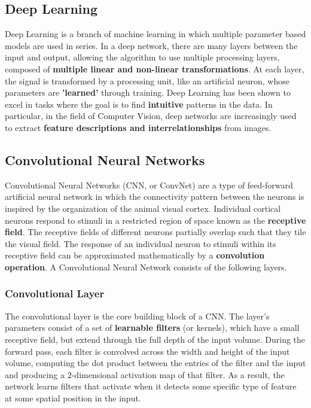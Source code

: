 \documentclass{article}
\begin{document}
			\subsection{Deep Learning}
				Deep Learning is a branch of machine learning in which multiple parameter based models are used in series. In a deep network, there are many layers between the input and output, allowing the algorithm to use multiple processing layers, composed of \textbf{multiple linear and non-linear transformations}. At each layer, the signal is transformed by a processing unit, like an artificial neuron, whose parameters are \textbf{'learned'} through training. Deep Learning has been shown to excel in tasks where the goal is to find \textbf{intuitive} patterns in the data. In particular, in the field of Computer Vision, deep networks are increasingly used to extract \textbf{feature descriptions and interrelationships} from images.

			\subsection{Convolutional Neural Networks}
			Convolutional Neural Networks (CNN, or ConvNet) are a type of feed-forward artificial neural network in which the connectivity pattern between the neurons is inspired by the organization of the animal visual cortex. Individual cortical neurons respond to stimuli in a restricted region of space known as the \textbf{receptive field}. The receptive fields of different neurons partially overlap such that they tile the visual field. The response of an individual neuron to stimuli within its receptive field can be approximated mathematically by a \textbf{convolution operation}. A Convolutional Neural Network consists of the following layers.
				
				\subsubsection{Convolutional Layer}
					The convolutional layer is the core building block of a CNN. The layer's parameters consist of a set of \textbf{learnable filters} (or kernels), which have a small receptive field, but extend through the full depth of the input volume. During the forward pass, each filter is convolved across the width and height of the input volume, computing the dot product between the entries of the filter and the input and producing a $2$-dimensional activation map of that filter. As a result, the network learns filters that activate when it detects some specific type of feature at some spatial position in the input.
\end{document}
